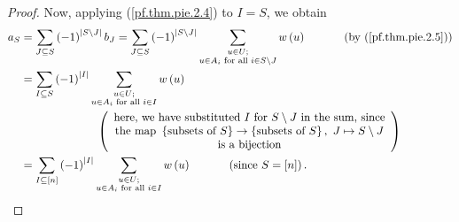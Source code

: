 \begin{proof}
Now, applying (\ref{pf.thm.pie.2.4}) to $I=S$, we obtain%
\begin{align*}
a_{S}  &  =\sum_{J\subseteq S}\left(  -1\right)  ^{\left\vert S\setminus
J\right\vert }b_{J}=\sum_{J\subseteq S}\left(  -1\right)  ^{\left\vert
S\setminus J\right\vert }\sum_{\substack{u\in U;\\u\in A_{i}\text{ for all
}i\in S\setminus J}}w\left(  u\right)  \ \ \ \ \ \ \ \ \ \ \left(  \text{by
(\ref{pf.thm.pie.2.5})}\right) \\
&  =\sum_{I\subseteq S}\left(  -1\right)  ^{\left\vert I\right\vert }%
\sum_{\substack{u\in U;\\u\in A_{i}\text{ for all }i\in I}}w\left(  u\right)
\\
&  \ \ \ \ \ \ \ \ \ \ \ \ \ \ \ \ \ \ \ \ \left(
\begin{array}
[c]{c}%
\text{here, we have substituted }I\text{ for }S\setminus J\text{ in the sum,
since}\\
\text{the map }\left\{  \text{subsets of }S\right\}  \rightarrow\left\{
\text{subsets of }S\right\}  ,\ J\mapsto S\setminus J\\
\text{is a bijection}%
\end{array}
\right) \\
&  =\sum_{I\subseteq\left[  n\right]  }\left(  -1\right)  ^{\left\vert
I\right\vert }\sum_{\substack{u\in U;\\u\in A_{i}\text{ for all }i\in
I}}w\left(  u\right)  \ \ \ \ \ \ \ \ \ \ \left(  \text{since }S=\left[
n\right]  \right)  .
\end{align*}



\end{proof}
